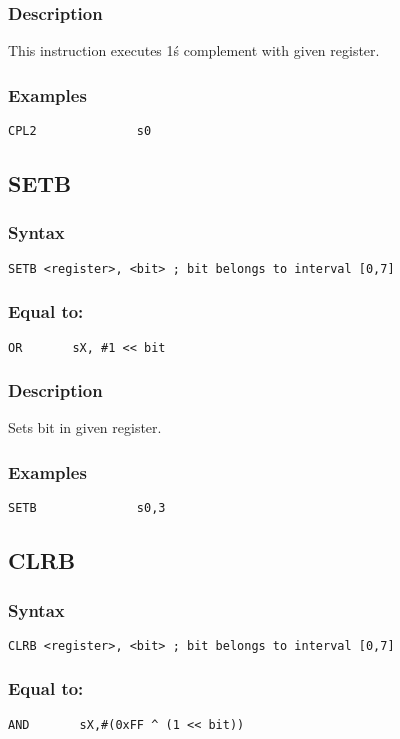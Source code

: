         \subsubsection{Description}
            This instruction executes 1\'s complement with given register.

        \subsubsection{Examples}
            \verb'CPL2              s0'

    \subsection{SETB}
        \subsubsection{Syntax}
            \verb'SETB <register>, <bit> ; bit belongs to interval [0,7]'

        \subsubsection{Equal to:}
            \verb'OR       sX, #1 << bit'

        \subsubsection{Description}
            Sets bit in given register.

        \subsubsection{Examples}
            \verb'SETB              s0,3'

    \subsection{CLRB}
        \subsubsection{Syntax}
            \verb'CLRB <register>, <bit> ; bit belongs to interval [0,7]'

        \subsubsection{Equal to:}
            \verb'AND       sX,#(0xFF ^ (1 << bit))'

